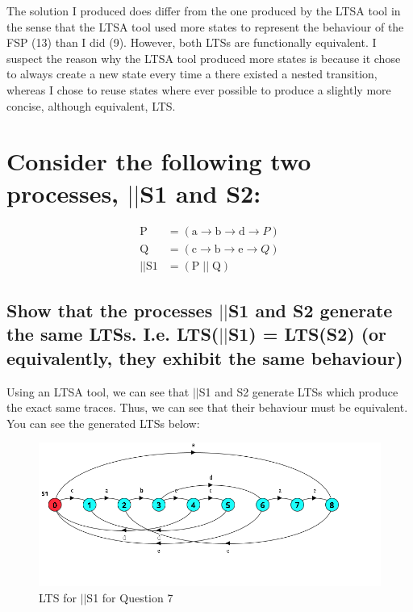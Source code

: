 \documentclass{article}[8pt]
\renewcommand{\thesubsection}{\thesection.\alph{subsection}}
\begin{document}
The solution I produced does differ from the one produced by the LTSA tool in the sense that the LTSA tool used more states to represent the behaviour of the FSP (13) than I did (9). However, both LTSs are functionally equivalent. I suspect the reason why the LTSA tool produced more states is because it chose to always create a new state every time a there existed a nested transition, whereas I chose to reuse states where ever possible to produce a slightly more concise, although equivalent, LTS.

\section[Question ~\thesection]{Consider the following two processes, $||$S1 and S2:}

\begin{align*}
	\text{P} &= (\text{a} \rightarrow \text{b} \rightarrow \text{d} \rightarrow {P}) \\
	\text{Q} &= (\text{c} \rightarrow \text{b} \rightarrow \text{e} \rightarrow {Q}) \\
	||\text{S1} &= (\text{P} \; || \; \text{Q})
\end{align*}

\subsection[~\thesubsection]{Show that the processes $||$S1 and S2 generate the same LTSs. I.e. LTS($||$S1) = LTS(S2) (or equivalently, they exhibit the same behaviour)}

Using an LTSA tool, we can see that $||$S1 and S2 generate LTSs which produce the exact same traces. Thus, we can see that their behaviour must be equivalent. You can see the generated LTSs below:

\begin{figure}[H]
	\includegraphics[width=\linewidth]{./imgs/Question-7-i.png}
	\caption{LTS for $||$S1 for Question 7}
	\label{fig:Question-7-i}
\end{figure}
\end{document}
